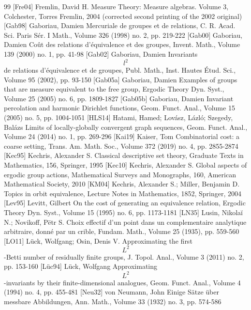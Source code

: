 \documentclass[10pt]{amsart}
\theoremstyle{definition}
\begin{document}
\begin{thebibliography}{99}
 [Fre04] Fremlin, David H. Measure Theory: Measure algebras. Volume 3, Colchester, Torres Fremlin, 2004 (corrected second printing of the 2002 original)
 [Gab98] Gaboriau, Damien Mercuriale de groupes et de relations, C. R. Acad. Sci. Paris Sér. I Math., Volume 326 (1998) no. 2, pp. 219-222
 [Gab00] Gaboriau, Damien Coût des relations d’équivalence et des groupes, Invent. Math., Volume 139 (2000) no. 1, pp. 41-98
 [Gab02] Gaboriau, Damien Invariants $$l^2$$ de relations d’équivalence et de groupes, Publ. Math., Inst. Hautes Étud. Sci., Volume 95 (2002), pp. 93-150
 [Gab05a] Gaboriau, Damien Examples of groups that are measure equivalent to the free group, Ergodic Theory Dyn. Syst., Volume 25 (2005) no. 6, pp. 1809-1827
 [Gab05b] Gaboriau, Damien Invariant percolation and harmonic Dirichlet functions, Geom. Funct. Anal., Volume 15 (2005) no. 5, pp. 1004-1051
 [HLS14] Hatami, Hamed; Lovász, Lázló; Szegedy, Balázs Limits of locally-globally convergent graph sequences, Geom. Funct. Anal., Volume 24 (2014) no. 1, pp. 269-296
 [Kai19] Kaiser, Tom Combinatorial cost: a coarse setting, Trans. Am. Math. Soc., Volume 372 (2019) no. 4, pp. 2855-2874
 [Kec95] Kechris, Alexander S. Classical descriptive set theory, Graduate Texts in Mathematics, 156, Springer, 1995
 [Kec10] Kechris, Alexander S. Global aspects of ergodic group actions, Mathematical Surveys and Monographs, 160, American Mathematical Society, 2010
 [KM04] Kechris, Alexander S.; Miller, Benjamin D. Topics in orbit equivalence, Lecture Notes in Mathematics, 1852, Springer, 2004
 [Lev95] Levitt, Gilbert On the cost of generating an equivalence relation, Ergodic Theory Dyn. Syst., Volume 15 (1995) no. 6, pp. 1173-1181
 [LN35] Lusin, Nikolaĭ N.; Novikoff, Pëtr S. Choix effectif d’un point dans un complementaire analytique arbitraire, donné par un crible, Fundam. Math., Volume 25 (1935), pp. 559-560
 [LO11] Lück, Wolfgang; Osin, Denis V. Approximating the first $${L}^2$$-Betti number of residually finite groups, J. Topol. Anal., Volume 3 (2011) no. 2, pp. 153-160
 [Lüc94] Lück, Wolfgang Approximating $${L}^2$$-invariants by their finite-dimensional analogues, Geom. Funct. Anal., Volume 4 (1994) no. 4, pp. 455-481
 [Neu32] von Neumann, John Einige Sätze über messbare Abbildungen, Ann. Math., Volume 33 (1932) no. 3, pp. 574-586

\end{thebibliography}
\end{document}
